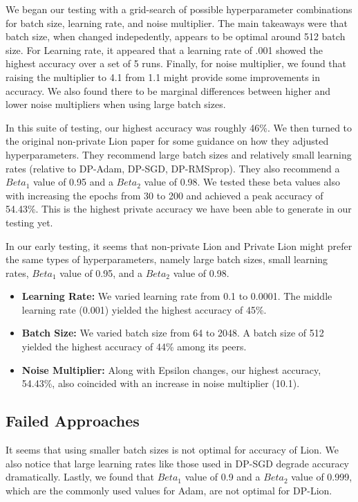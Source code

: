 We began our testing with a grid-search of possible hyperparameter combinations for batch size, learning rate, and noise multiplier. The main takeaways were that batch size,
when changed indepedently, appears to be optimal around 512 batch size. For Learning rate, it appeared that a learning rate of .001 showed the highest accuracy over a set of 5
runs. Finally, for noise multiplier, we found that raising the multiplier to 4.1 from 1.1 might provide some improvements in accuracy. We also found there to be marginal differences
between higher and lower noise multipliers when using large batch sizes.

In this suite of testing, our highest accuracy was roughly 46\%. We then turned to the original non-private Lion paper for some guidance on how they adjusted hyperparameters. They recommend 
large batch sizes and relatively small learning rates (relative to DP-Adam, DP-SGD, DP-RMSprop). They also recommend a $Beta_{1}$ value of 0.95 and a $Beta_{2}$ value of 0.98. We tested
these beta values also with increasing the epochs from 30 to 200 and achieved a peak accuracy of 54.43\%. This is the highest private accuracy we have been able to generate in our testing
yet. 

In our early testing, it seems that non-private Lion and Private Lion might prefer the same types of hyperparameters, namely large batch sizes, small learning rates, $Beta_{1}$ value of 0.95,
and a $Beta_{2}$ value of 0.98.

\begin{itemize}
    \item \textbf{Learning Rate:} We varied learning rate from 0.1 to 0.0001. The middle learning rate (0.001) yielded the highest accuracy of 45\%.
    \item \textbf{Batch Size:} We varied batch size from 64 to 2048. A batch size of 512 yielded the highest accuracy of 44\% among its peers.
    \item \textbf{Noise Multiplier:} Along with Epsilon changes, our highest accuracy, 54.43\%, also coincided with an increase in noise multiplier (10.1).
\end{itemize}

\subsection{Failed Approaches}\label{subsec:failed-approaches2}
It seems that using smaller batch sizes is not optimal for accuracy of Lion. We also notice that large learning rates like those used in DP-SGD degrade accuracy dramatically. Lastly, 
we found that $Beta_{1}$ value of 0.9 and a $Beta_{2}$ value of 0.999, which are the commonly used values for Adam, are not optimal for DP-Lion.

